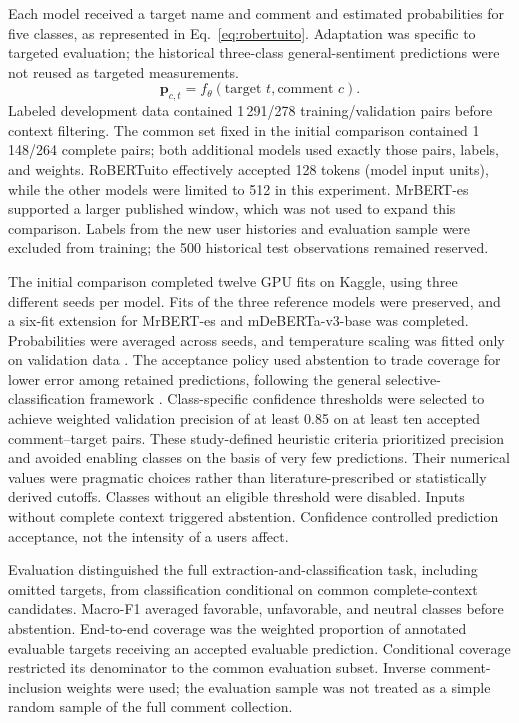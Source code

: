 \documentclass[conference,letterpaper]{IEEEtran}
\begin{document}
Each model received a target name and comment and estimated probabilities for five classes, as represented in Eq.~\eqref{eq:robertuito}. Adaptation was specific to targeted evaluation; the historical three-class general-sentiment predictions were not reused as targeted measurements.
\begin{equation}
\boldsymbol{p}_{c,t}=f_{\theta}(\text{target }t,\text{comment }c).
\label{eq:robertuito}
\end{equation}
Labeled development data contained 1\,291/278 training/validation pairs before context filtering. The common set fixed in the initial comparison contained 1\,148/264 complete pairs; both additional models used exactly those pairs, labels, and weights. RoBERTuito effectively accepted 128 tokens (model input units), while the other models were limited to 512 in this experiment. MrBERT-es supported a larger published window, which was not used to expand this comparison. Labels from the new user histories and evaluation sample were excluded from training; the 500 historical test observations remained reserved.

The initial comparison completed twelve GPU fits on Kaggle, using three different seeds per model. Fits of the three reference models were preserved, and a six-fit extension for MrBERT-es and mDeBERTa-v3-base was completed. Probabilities were averaged across seeds, and temperature scaling was fitted only on validation data \cite{Guo2017Calibration}. The acceptance policy used abstention to trade coverage for lower error among retained predictions, following the general selective-classification framework \cite{Geifman2017Selective}. Class-specific confidence thresholds were selected to achieve weighted validation precision of at least 0.85 on at least ten accepted comment--target pairs. These study-defined heuristic criteria prioritized precision and avoided enabling classes on the basis of very few predictions. Their numerical values were pragmatic choices rather than literature-prescribed or statistically derived cutoffs. Classes without an eligible threshold were disabled. Inputs without complete context triggered abstention. Confidence controlled prediction acceptance, not the intensity of a user\textquotesingle s affect. 

Evaluation distinguished the full extraction-and-classification task, including omitted targets, from classification conditional on common complete-context candidates. Macro-F1 averaged favorable, unfavorable, and neutral classes before abstention. End-to-end coverage was the weighted proportion of annotated evaluable targets receiving an accepted evaluable prediction. Conditional coverage restricted its denominator to the common evaluation subset. Inverse comment-inclusion weights were used; the evaluation sample was not treated as a simple random sample of the full comment collection.
\end{document}
